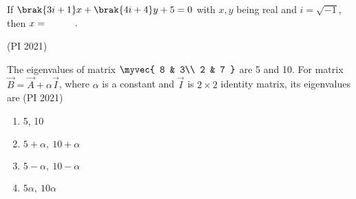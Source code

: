 \item
If $\brak{3i + 1}x + \brak{4i + 4}y + 5 = 0$ with $x, y$ being real and $i = \sqrt{-1}$, then $x = \rule{1cm}{0.01pt}.$ 

\hfill (PI 2021)
\item
The eigenvalues of matrix 
$
\myvec{
8 & 3\\
2 & 7
}
$
are 5 and 10. For matrix $\vec{B} = \vec{A} + \alpha \vec{I}$, where $\alpha$ is a constant and $\vec{I}$ is $2 \times 2$ identity matrix, its eigenvalues are
\hfill (PI 2021)
\begin{multicols}{4}
\begin{enumerate}
\item 5, 10
\item $5 + \alpha,\ 10 + \alpha$
\item $5 - \alpha,\ 10 - \alpha$
\item $5\alpha,\ 10\alpha$
\end{enumerate}
\end{multicols}
